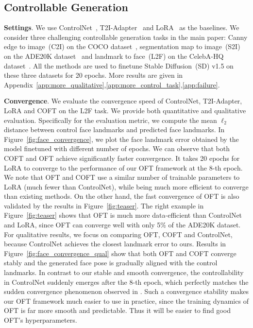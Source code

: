 \vspace{-1.5mm}
\subsection{Controllable Generation}
\vspace{-1.05mm}


\textbf{Settings}. We use ControlNet~\cite{zhang2023adding}, T2I-Adapter~\cite{mou2023t2i} and LoRA~\cite{hulora2022} as the baselines. We consider three challenging controllable generation tasks in the main paper: Canny edge to image~(C2I) on the COCO dataset~\cite{lin2014microsoft}, segmentation map to image~(S2I) on the ADE20K dataset~\cite{zhou2017scene} and landmark to face~(L2F) on the CelebA-HQ dataset~\cite{karras2018progressive,xia2021tedigan}. All the methods are used to finetune Stable Diffusion~(SD) v1.5 on these three datasets for 20 epochs. More results are given in Appendix~\ref{app:more_qualitative},\ref{app:more_control_task},\ref{app:failure}.



\textbf{Convergence}. We evaluate the convergence speed of ControlNet, T2I-Adapter, LoRA and COFT on the L2F task. We provide both quantitative and qualitative evaluation. Specifically for the evaluation metric, we compute the mean $\ell_2$ distance between control face landmarks and predicted face landmarks. In Figure~\ref{fig:face_convergence}, we plot the face landmark error obtained by the model finetuned with different number of epochs. We can observe that both COFT and OFT achieve significantly faster convergence. It takes 20 epochs for LoRA to converge to the performance of our OFT framework at the 8-th epoch. We note that OFT and COFT use a similar number of trainable parameters to LoRA (much fewer than ControlNet), while being much more efficient to converge than existing methods. On the other hand, the fast convergence of OFT is also validated by the results in Figure~\ref{fig:teaser}. The right example in Figure~\ref{fig:teaser} shows that OFT is much more data-efficient than ControlNet and LoRA, since OFT can converge well with only 5\% of the ADE20K dataset. For qualitative results, we focus on comparing OFT, COFT and ControlNet, because ControlNet achieves the closest landmark error to ours. Results in Figure~\ref{fig:face_convergence_qual} show that both OFT and COFT converge stably and the generated face pose is gradually aligned with the control landmarks. In contrast to our stable and smooth convergence, the controllability in ControlNet suddenly emerges after the 8-th epoch, which perfectly matches the sudden convergence phenomenon observed in \cite{zhang2023adding}. Such a convergence stability makes our OFT framework much easier to use in practice, since the training dynamics of OFT is far more smooth and predictable. Thus it will be easier to find good OFT's hyperparameters.





